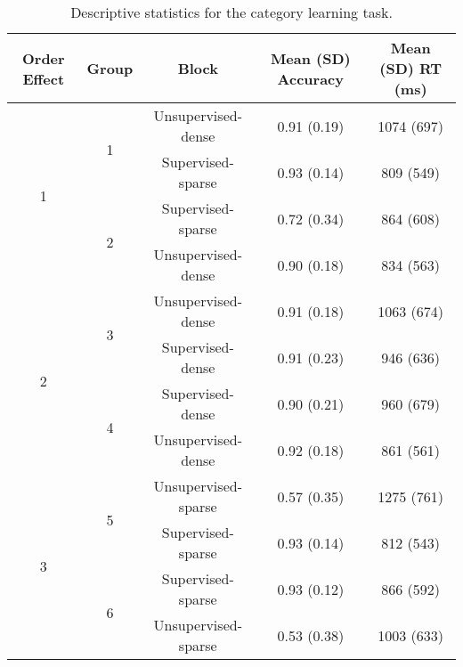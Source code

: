 \documentclass[../dissertation.tex]{subfiles}
\begin{document}
\begin{table}[H]
\caption{Descriptive statistics for the category learning task.}
\vspace{-10pt}
\begin{center}
\begin{tabular}{ccccc}
\hline
Order Effect       & Group              & Block               & Mean (SD) Accuracy & Mean (SD) RT (ms) \\ \hline
\multirow{4}{*}{1} & \multirow{2}{*}{1} & Unsupervised-dense  & 0.91 (0.19)        & 1074 (697)        \\ \cline{3-5} 
                   &                    & Supervised-sparse   & 0.93 (0.14)        & 809 (549)         \\ \cline{2-5} 
                   & \multirow{2}{*}{2} & Supervised-sparse   & 0.72 (0.34)        & 864 (608)         \\ \cline{3-5} 
                   &                    & Unsupervised-dense  & 0.90 (0.18)        & 834 (563)         \\ \hline
\multirow{4}{*}{2} & \multirow{2}{*}{3} & Unsupervised-dense  & 0.91 (0.18)        & 1063 (674)        \\ \cline{3-5} 
                   &                    & Supervised-dense    & 0.91 (0.23)        & 946 (636)         \\ \cline{2-5} 
                   & \multirow{2}{*}{4} & Supervised-dense    & 0.90 (0.21)        & 960 (679)         \\ \cline{3-5} 
                   &                    & Unsupervised-dense  & 0.92 (0.18)        & 861 (561)         \\ \hline
\multirow{4}{*}{3} & \multirow{2}{*}{5} & Unsupervised-sparse & 0.57 (0.35)        & 1275 (761)        \\ \cline{3-5} 
                   &                    & Supervised-sparse   & 0.93 (0.14)        & 812 (543)         \\ \cline{2-5} 
                   & \multirow{2}{*}{6} & Supervised-sparse   & 0.93 (0.12)        & 866 (592)         \\ \cline{3-5} 
                   &                    & Unsupervised-sparse & 0.53 (0.38)        & 1003 (633)        \\ \hline
\end{tabular}
\label{exp1expdesc}
\end{center}
\end{table}
\end{document}

